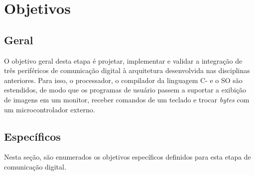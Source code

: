 \documentclass[
	12pt,
	oneside,
	a4paper,
	english,
	french,
	spanish,
	brazil,
	]{abntex2}
\begin{document}
\chapter[Objetivos]{Objetivos}
\section{Geral}
O objetivo geral desta etapa é projetar, implementar e validar a integração de três periféricos de comunicação digital à arquitetura desenvolvida nas disciplinas anteriores. Para isso, o processador, o compilador da linguagem C- e o SO são estendidos, de modo que os programas de usuário passem a suportar a exibição de imagens em um monitor, receber comandos de um teclado e trocar \emph{bytes} com um microcontrolador externo.

\section{Específicos}
Nesta seção, são enumerados os objetivos específicos definidos para esta etapa de comunicação digital.
\end{document}
